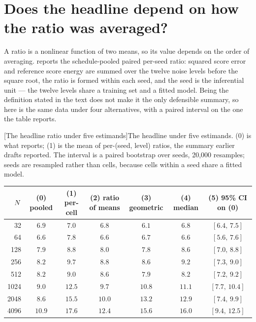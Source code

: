 
\section{Does the headline depend on how the ratio was averaged?}
\label{sec:aggregation-headline}

A ratio is a nonlinear function of two means, so its value depends on the order
of averaging. \headlinetable{} reports the schedule-pooled paired
per-seed ratio: squared score error and reference score energy are summed over
the twelve noise levels before the square root, the ratio is formed within each
seed, and the seed is the inferential unit --- the twelve levels share a
training set and a fitted model. Being the definition stated in the text does
not make it the only defensible summary, so here is the same data under four
alternatives, with a paired interval on the one the table reports.

\begin{center}
\begin{minipage}{\linewidth}\small\centering
\setlength{\tabcolsep}{3pt}
[The headline ratio under five estimands]{The headline under five estimands. (0) is what
\headlinetable{} reports; (1) is the mean of per-(seed, level)
ratios, the summary earlier drafts reported. The interval is a paired
bootstrap over seeds, 20,000 resamples; seeds are resampled rather than
cells, because cells within a seed share a fitted model.}
\label{tab:aggregation}
\begin{tabular}{rcccccc}
\toprule
$N$ & (0) pooled & (1) per-cell & (2) ratio of means & (3) geometric & (4) median
        & (5) 95\% CI on (0) \\
\midrule
32 & $6.9$ & $7.0$ & $6.8$ & $6.1$ & $6.8$ & $[6.4,\,7.5]$ \\
64 & $6.6$ & $7.8$ & $6.6$ & $6.7$ & $6.6$ & $[5.6,\,7.6]$ \\
128 & $7.9$ & $8.8$ & $8.0$ & $7.8$ & $8.6$ & $[7.0,\,8.8]$ \\
256 & $8.2$ & $9.7$ & $8.8$ & $8.6$ & $9.2$ & $[7.3,\,9.0]$ \\
512 & $8.2$ & $9.0$ & $8.6$ & $7.9$ & $8.2$ & $[7.2,\,9.2]$ \\
1024 & $9.0$ & $12.5$ & $9.7$ & $10.8$ & $11.1$ & $[7.7,\,10.4]$ \\
2048 & $8.6$ & $15.5$ & $10.0$ & $13.2$ & $12.9$ & $[7.4,\,9.9]$ \\
4096 & $10.9$ & $17.6$ & $12.4$ & $15.6$ & $16.0$ & $[9.4,\,12.5]$ \\
\bottomrule
\end{tabular}
\end{minipage}
\end{center}

